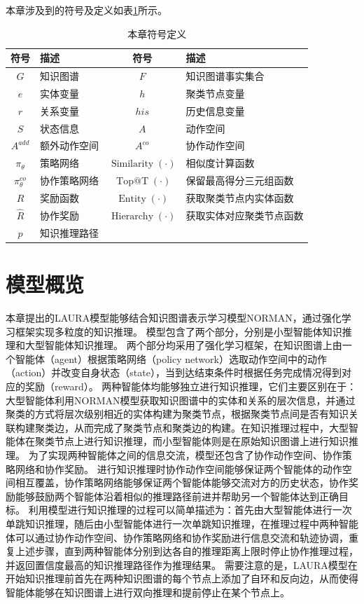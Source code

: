 \documentclass[algorithmlist, AutoFakeBold, AutoFakeSlant, figurelist, tablelist, nomlist, engineering, openany]{seuthesix} %
\begin{document}
本章涉及到的符号及定义如表\ref{3_symbols}所示。
\begin{table}[ht]
  \centering
  \caption{本章符号定义}
  \begin{tabular*}{0.8\textwidth}{@{\extracolsep{\fill}}clcl}
		\toprule[1pt]
    符号 & 描述 & 符号 & 描述\\ \hline
    $G$ & 知识图谱 & $F$ & 知识图谱事实集合\\
    $e$ & 实体变量 & $h$ & 聚类节点变量\\
    $r$ & 关系变量 & $his$ & 历史信息变量\\
    $S$ & 状态信息 & $A$ & 动作空间\\
    $A^{add}$ & 额外动作空间 & $A^{co}$ & 协作动作空间\\
    $\pi_\theta$ & 策略网络 & $\operatorname{Similarity}(\cdot)$ & 相似度计算函数\\
    $\pi_\theta^{co}$ & 协作策略网络 & $\operatorname{Top@T}(\cdot)$ & 保留最高得分三元组函数\\
    $R$ & 奖励函数 & $\operatorname{Entity}(\cdot)$ & 获取聚类节点内实体函数\\
    $\hat{R}$ & 协作奖励 & $\operatorname{Hierarchy}(\cdot)$ & 获取实体对应聚类节点函数\\
    $p$ & 知识推理路径 & &\\
		\bottomrule[1pt]
	\end{tabular*}
  \label{3_symbols}
\end{table}

\section{模型概览}
本章提出的LAURA模型能够结合知识图谱表示学习模型NORMAN，通过强化学习框架实现多粒度的知识推理。
模型包含了两个部分，分别是小型智能体知识推理和大型智能体知识推理。
两个部分均采用了强化学习框架，在知识图谱上由一个智能体（agent）根据策略网络（policy network）选取动作空间中的动作（action）并改变自身状态（state），当到达结束条件时根据任务完成情况得到对应的奖励（reward）。
两种智能体均能够独立进行知识推理，它们主要区别在于：大型智能体利用NORMAN模型获取知识图谱中的实体和关系的层次信息，并通过聚类的方式将层次级别相近的实体构建为聚类节点，根据聚类节点间是否有知识关联构建聚类边，从而完成了聚类节点和聚类边的构建。在知识推理过程中，大型智能体在聚类节点上进行知识推理，而小型智能体则是在原始知识图谱上进行知识推理。
为了实现两种智能体之间的信息交流，模型还包含了协作动作空间、协作策略网络和协作奖励。
进行知识推理时协作动作空间能够保证两个智能体的动作空间相互覆盖，协作策略网络能够保证两个智能体能够交流对方的历史状态，协作奖励能够鼓励两个智能体沿着相似的推理路径前进并帮助另一个智能体达到正确目标。
利用模型进行知识推理的过程可以简单描述为：首先由大型智能体进行一次单跳知识推理，随后由小型智能体进行一次单跳知识推理，在推理过程中两种智能体可以通过协作动作空间、协作策略网络和协作奖励进行信息交流和轨迹协调，重复上述步骤，直到两种智能体分别到达各自的推理距离上限时停止协作推理过程，并返回置信度最高的知识推理路径作为推理结果。
需要注意的是，LAURA模型在开始知识推理前首先在两种知识图谱的每个节点上添加了自环和反向边，从而使得智能体能够在知识图谱上进行双向推理和提前停止在某个节点上。
\end{document}
